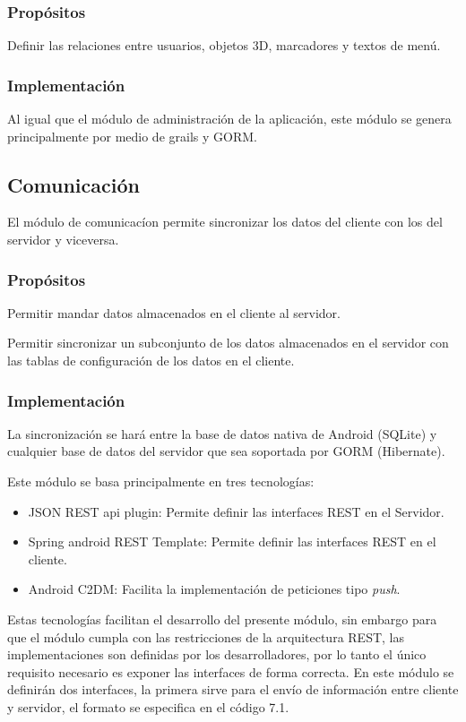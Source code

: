 \documentclass[12pt,a4paper,spanish,openany]{book}
\begin{document}
\subsubsection{Propósitos}
Definir las relaciones entre usuarios, objetos 3D, marcadores y textos de
menú.

\subsubsection{Implementación}

Al igual que el módulo de administración de la aplicación, este módulo se genera
principalmente por medio de grails y GORM.

\subsection{Comunicación}
El módulo de comunicacíon permite sincronizar los datos del cliente con los del
servidor y viceversa.
\subsubsection{Propósitos}

Permitir mandar datos almacenados en el cliente al servidor.

Permitir sincronizar un subconjunto de los datos almacenados en el servidor con
las tablas de configuración de los datos en el cliente.

\subsubsection{Implementación}
La sincronización se hará entre la base de datos nativa de Android (SQLite) y
cualquier base de datos del servidor que sea soportada por GORM (Hibernate).

 
Este módulo se basa principalmente en tres tecnologías:

\begin{itemize}
  \item JSON REST api plugin: Permite definir las interfaces REST en el
  Servidor.
  \item Spring android REST Template: Permite definir las interfaces REST en el
  cliente.
  \item Android C2DM: Facilita la implementación de peticiones tipo \emph{push}.
\end{itemize}
Estas tecnologías facilitan el desarrollo del presente módulo, sin embargo para
que el módulo cumpla con las restricciones de la arquitectura REST, las
implementaciones son definidas por los desarrolladores, por lo tanto el único
requisito necesario es exponer las interfaces de forma correcta. En este módulo
se definirán dos interfaces, la primera sirve para el envío de información entre
cliente y servidor, el formato se especifica en el código 7.1.
\end{document}
